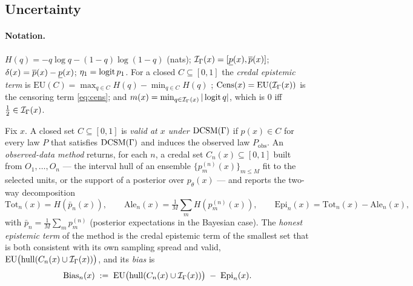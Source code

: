\subsection{Uncertainty}
\label{app:uq}

\paragraph{Notation.} $H(q)=-q\log q-(1-q)\log(1-q)$ (nats);
$\mathcal{I}_\Gamma(x)=[\underline{p}(x),\overline{p}(x)]$; $\delta(x)=\overline{p}(x)-\underline{p}(x)$; $\eta_1=\operatorname{logit} p_1$.
For a closed $C\subseteq[0,1]$ the \emph{credal epistemic term} is
$\mathrm{EU}(C)=\max_{q\in C}H(q)-\min_{q\in C}H(q)$ \citep{abellan2005difference};
$\mathrm{Cens}(x)=\mathrm{EU}(\mathcal{I}_\Gamma(x))$ is the censoring term \eqref{eq:cens}; and
$m(x)=\min_{q\in\mathcal{I}_\Gamma(x)}|\operatorname{logit} q|$, which is $0$ iff $\tfrac12\in\mathcal{I}_\Gamma(x)$.

\begin{definition}
\label{def:valid}
Fix $x$. A closed set $C\subseteq[0,1]$ is \emph{valid at $x$ under $\textup{DCSM}(\Gamma)$} if
$p(x)\in C$ for every law $P$ that satisfies $\textup{DCSM}(\Gamma)$ and induces the observed law
$P_{\mathrm{obs}}$. An \emph{observed-data method} returns, for each $n$, a credal set
$C_n(x)\subseteq[0,1]$ built from $O_1,\dots,O_n$ --- the interval hull of an ensemble
$\{p^{(n)}_m(x)\}_{m\le M}$ fit to the selected units, or the support of a posterior over
$p_\theta(x)$ --- and reports the two-way decomposition
\[
  \mathrm{Tot}_n(x)=H(\bar p_n(x)),\qquad
  \mathrm{Ale}_n(x)=\tfrac1M\textstyle\sum_m H(p^{(n)}_m(x)),\qquad
  \mathrm{Epi}_n(x)=\mathrm{Tot}_n(x)-\mathrm{Ale}_n(x),
\]
with $\bar p_n=\tfrac1M\sum_m p^{(n)}_m$ (posterior expectations in the Bayesian case).
The \emph{honest epistemic term} of the method is the credal epistemic term of the smallest
set that is both consistent with its own sampling spread and valid,
$\mathrm{EU}\big(\mathrm{hull}(C_n(x)\cup\mathcal{I}_\Gamma(x))\big)$, and its \emph{bias} is
\begin{equation}
  \mathrm{Bias}_n(x)\;:=\;\mathrm{EU}\big(\mathrm{hull}(C_n(x)\cup\mathcal{I}_\Gamma(x))\big)\;-\;\mathrm{Epi}_n(x).
  \label{eq:uq-bias}
\end{equation}
\end{definition}

